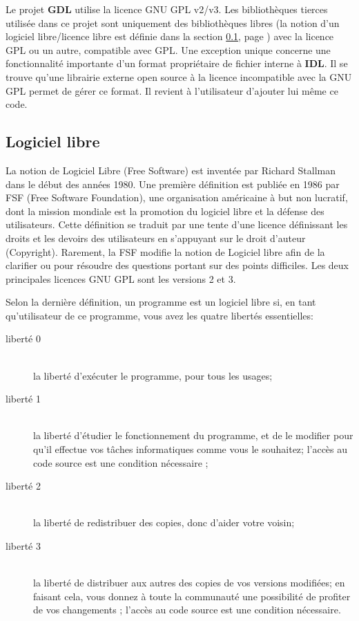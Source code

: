 Le projet \textbf{GDL} utilise la licence GNU GPL v2/v3. Les bibliothèques tierces utilisée dans ce projet sont uniquement des bibliothèques libres (la notion d'un logiciel libre/licence libre est définie dans la section \ref{log_lib}, page \pageref{log_lib}) avec la licence GPL ou un autre, compatible avec GPL. Une exception unique concerne une fonctionnalité importante d'un format propriétaire de fichier interne à \textbf{IDL}. Il se trouve qu'une librairie externe open source à la licence incompatible avec la GNU GPL permet de gérer ce format. Il revient à l'utilisateur d'ajouter lui même ce code.



\subsection{Logiciel libre}
\label{log_lib}


La notion de Logiciel Libre (Free Software) est inventée par Richard Stallman dans le début des années 1980. Une première définition est publiée en 1986 par FSF (Free Software Foundation), une organisation américaine à but non lucratif, dont la mission mondiale est la promotion du logiciel libre et la défense des utilisateurs. Cette définition se traduit par une tente d'une licence définissant les droits et les devoirs des utilisateurs en s'appuyant sur le droit d'auteur (Copyright). Rarement, la FSF modifie la notion de Logiciel libre afin de la clarifier ou pour résoudre des questions portant sur des points difficiles. Les deux principales licences GNU GPL sont les versions 2 et 3.

Selon la dernière définition, un programme est un logiciel libre si, en tant qu'utilisateur de ce programme, vous avez les quatre libertés essentielles:

\begin{description}
	\item[liberté 0]  \hfill \\ %
la liberté d'exécuter le programme, pour tous les usages;
	\item[liberté 1]  \hfill \\  %
la liberté d'étudier le fonctionnement du programme, et de le modifier pour qu'il effectue vos tâches informatiques comme vous le souhaitez; l'accès au code source est une condition nécessaire ;
	\item[liberté 2]  \hfill \\ %
la liberté de redistribuer des copies, donc d'aider votre voisin;
	\item[liberté 3]   \hfill \\ %
la liberté de distribuer aux autres des copies de vos versions modifiées; en faisant cela, vous donnez à toute la communauté une possibilité de profiter de vos changements ; l'accès au code source est une condition nécessaire.
\end{description}




